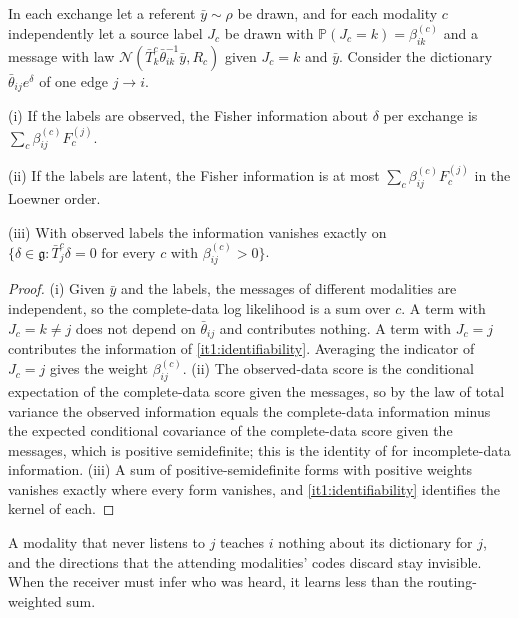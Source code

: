 In each exchange let a referent $\bar y\sim\rho$ be drawn, and for each modality $c$ independently let a source label $J_c$ be drawn with $\mathbb P(J_c=k)=\beta^{(c)}_{ik}$ and a message with law $\mathcal N(\bar T_k^c\bar\theta_{ik}^{-1}\bar y,R_c)$ given $J_c=k$ and $\bar y$. Consider the dictionary $\bar\theta_{ij}e^{\delta}$ of one edge $j\to i$.

\textup{(i)} If the labels are observed, the Fisher information about $\delta$ per exchange is $\sum_c\beta^{(c)}_{ij}F_c^{(j)}$.

\textup{(ii)} If the labels are latent, the Fisher information is at most $\sum_c\beta^{(c)}_{ij}F_c^{(j)}$ in the Loewner order.

\textup{(iii)} With observed labels the information vanishes exactly on $\{\delta\in\mathfrak g:\bar T_j^c\delta=0\text{ for every }c\text{ with }\beta^{(c)}_{ij}>0\}$.
\begin{proof}
(i) Given $\bar y$ and the labels, the messages of different modalities are independent, so the complete-data log likelihood is a sum over $c$. A term with $J_c=k\neq j$ does not depend on $\bar\theta_{ij}$ and contributes nothing. A term with $J_c=j$ contributes the information of \cref{it1:identifiability}. Averaging the indicator of $J_c=j$ gives the weight $\beta^{(c)}_{ij}$. (ii) The observed-data score is the conditional expectation of the complete-data score given the messages, so by the law of total variance the observed information equals the complete-data information minus the expected conditional covariance of the complete-data score given the messages, which is positive semidefinite; this is the identity of \citet{Louis1982} for incomplete-data information. (iii) A sum of positive-semidefinite forms with positive weights vanishes exactly where every form vanishes, and \cref{it1:identifiability} identifies the kernel of each.
\end{proof}

A modality that never listens to $j$ teaches $i$ nothing about its dictionary for $j$, and the directions that the attending modalities' codes discard stay invisible. When the receiver must infer who was heard, it learns less than the routing-weighted sum.

